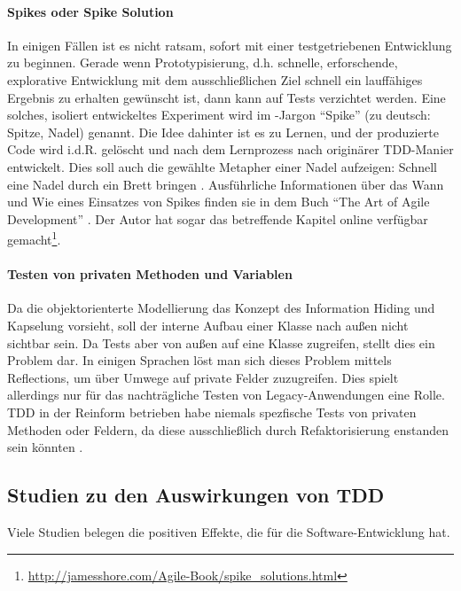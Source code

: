   \paragraph{Spikes oder Spike Solution} In einigen Fällen ist es nicht ratsam, sofort mit einer testgetriebenen Entwicklung zu beginnen. Gerade wenn Prototypisierung, d.h. schnelle, erforschende, explorative Entwicklung mit dem ausschließlichen Ziel schnell ein lauffähiges Ergebnis zu erhalten gewünscht ist, dann kann auf Tests verzichtet werden. Eine solches, isoliert entwickeltes Experiment wird im -Jargon "`Spike"' (zu deutsch: Spitze, Nadel) genannt. Die Idee dahinter ist es zu Lernen, und der produzierte Code wird i.d.R. gelöscht und nach dem Lernprozess nach originärer TDD-Manier entwickelt. Dies soll auch die gewählte Metapher einer Nadel aufzeigen: Schnell eine Nadel durch ein Brett bringen \citep{shore_art_2007}. Ausführliche Informationen über das Wann und Wie eines Einsatzes von Spikes finden sie in dem Buch "`The Art of Agile Development"' \citep{shore_art_2007}. Der Autor hat sogar das betreffende Kapitel online verfügbar gemacht\footnote{\url{http://jamesshore.com/Agile-Book/spike_solutions.html}}.

  \paragraph{Testen von privaten Methoden und Variablen} Da die objektorienterte Modellierung das Konzept des Information Hiding und Kapselung vorsieht, soll der interne Aufbau einer Klasse nach außen nicht sichtbar sein. Da Tests aber von außen auf eine Klasse zugreifen, stellt dies ein Problem dar. In einigen Sprachen löst man sich dieses Problem mittels Reflections, um über Umwege auf private Felder zuzugreifen. Dies spielt allerdings nur für das nachträgliche Testen von Legacy-Anwendungen eine Rolle. TDD in der Reinform betrieben habe niemals spezfische Tests von privaten Methoden oder Feldern, da diese ausschließlich durch Refaktorisierung enstanden sein könnten \citep{caroli_agile_2008}.
 
  
  
\subsection{Studien zu den Auswirkungen von TDD}

Viele Studien belegen die positiven Effekte, die  für die Software-Entwicklung hat.


